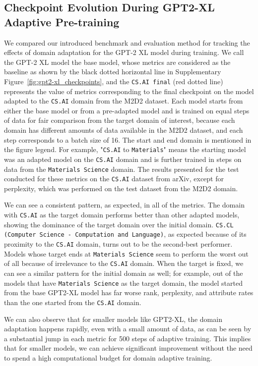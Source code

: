 \documentclass[10pt]{article}
\begin{document}
\subsection{Checkpoint Evolution During GPT2-XL Adaptive Pre-training}
\label{subsubsec:GPT2-XL-checkpoint}
We compared our introduced benchmark and evaluation method for tracking the effects of domain adaptation for the GPT-2 XL model during training. We call the GPT-2 XL model the base model, whose metrics are considered as the baseline as shown by the black dotted horizontal line in Supplementary Figure~\ref{fig:gpt2-xl_checkpoints}, and the \texttt{CS.AI final} (red dotted line) represents the value of metrics corresponding to the final checkpoint on the model adapted to the \texttt{CS.AI} domain from the M2D2 dataset. Each model starts from either the base model or from a pre-adapted model and is trained on equal steps of data for fair comparison from the target domain of interest, because each domain has different amounts of data available in the M2D2 dataset, and each step corresponds to a batch size of 16. The start and end domain is mentioned in the figure legend. For example, "\texttt{CS.AI} to \texttt{Materials}" means the starting model was an adapted model on the \texttt{CS.AI} domain and is further trained in steps on data from the \texttt{Materials Science} domain. The results presented for the test conducted for these metrics on the \texttt{CS.AI} dataset from arXiv, except for perplexity, which was performed on the test dataset from the M2D2 domain.

We can see a consistent pattern, as expected, in all of the metrics. The domain with \texttt{CS.AI} as the target domain performs better than other adapted models, showing the dominance of the target domain over the initial domain. \texttt{CS.CL (Computer Science - Computation and Language)}, as expected because of its proximity to the \texttt{CS.AI} domain, turns out to be the second-best performer. Models whose target ends at \texttt{Materials Science} seem to perform the worst out of all because of irrelevance to the \texttt{CS.AI} domain. When the target is fixed, we can see a similar pattern for the initial domain as well; for example, out of the models that have \texttt{Materials Science} as the target domain, the model started from the base GPT2-XL model has far worse rank, perplexity, and attribute rates than the one started from the \texttt{CS.AI} domain.

We can also observe that for smaller models like GPT2-XL, the domain adaptation happens rapidly, even with a small amount of data, as can be seen by a substantial jump in each metric for 500 steps of adaptive training. This implies that for smaller models, we can achieve significant improvement without the need to spend a high computational budget for domain adaptive training.
\end{document}

